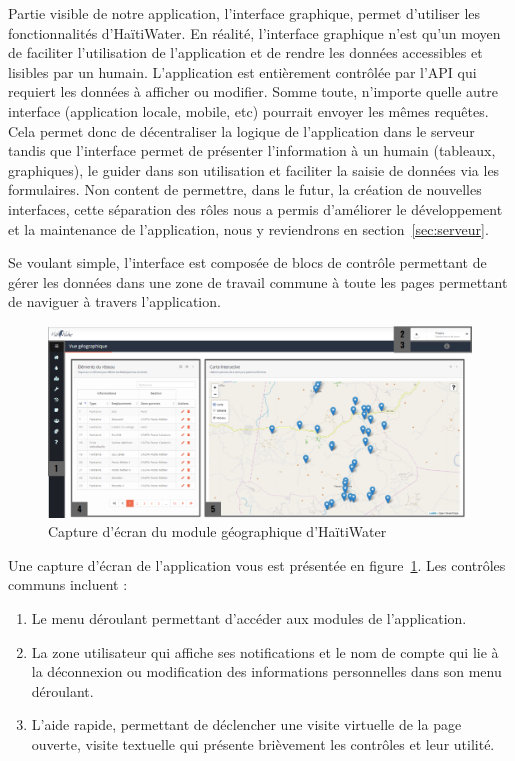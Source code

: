 \documentclass{EPL-master-thesis-covers-FR}
\begin{document}
			Partie visible de notre application, l'interface graphique, permet d'utiliser les fonctionnalités d'HaïtiWater. En réalité, l'interface graphique n'est qu'un moyen de faciliter l'utilisation de l'application et de rendre les données accessibles et lisibles par un humain. L'application est entièrement contrôlée par l'API qui requiert les données à afficher ou modifier. Somme toute, n'importe quelle autre interface (application locale, mobile, etc) pourrait envoyer les mêmes requêtes. Cela permet donc de décentraliser la logique de l'application dans le serveur tandis que l'interface permet de présenter l'information à un humain (tableaux, graphiques), le guider dans son utilisation et faciliter la saisie de données via les formulaires. Non content de permettre, dans le futur, la création de nouvelles interfaces, cette séparation des rôles nous a permis d'améliorer le développement et la maintenance de l'application, nous y reviendrons en section~\ref{sec:serveur}.

			Se voulant simple, l'interface est composée de blocs de contrôle permettant de gérer les données dans une zone de travail commune à toute les pages permettant de naviguer à travers l'application.

			\begin{figure}[H]
				\includegraphics[width=\textwidth]{images/screen_gis_numbered.png}
				\caption{Capture d'écran du module géographique d'HaïtiWater}
				\label{fig:capture_gis}
			\end{figure}

			Une capture d'écran de l'application vous est présentée en figure~\ref{fig:capture_gis}. Les contrôles communs incluent :
			\begin{enumerate}
				\item Le menu déroulant permettant d'accéder aux modules de l'application.
				\item La zone utilisateur qui affiche ses notifications et le nom de compte qui lie à la déconnexion ou modification des informations personnelles dans son menu déroulant.
				\item L'aide rapide, permettant de déclencher une visite virtuelle de la page ouverte, visite textuelle qui présente brièvement les contrôles et leur utilité.
			\end{enumerate}
\end{document}

